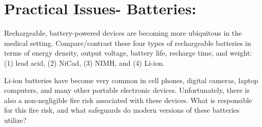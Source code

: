 \section{Practical Issues- Batteries:}
    Rechargeable, battery-powered devices are becoming more ubiquitous
    in the medical setting.  Compare/contrast these four types of rechargeable
    batteries in terms of energy density, output voltage, battery life,
    recharge time, and weight: (1) lead acid, (2) NiCad, (3) NIMH, and (4)
    Li-ion.

    Li-ion batteries have become very common in cell phones, digital cameras,
    laptop computers, and many other portable electronic devices.
    Unfortunately, there is also a non-negligible fire risk associated with
    these devices.  What is responsible for this fire risk, and what safeguards
    do modern versions of these batteries utilize?

